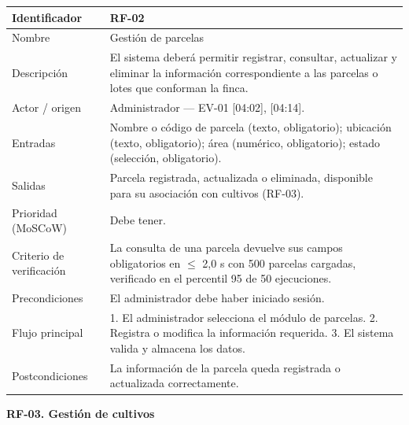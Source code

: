 \documentclass[12pt,a4paper]{article}
\begin{document}
\begin{center}
\begin{longtable}{|p{3.5cm}|p{10.7cm}|}
\hline
Identificador & RF-02 \\
\hline
Nombre & Gestión de parcelas \\
\hline
Descripción & El sistema deberá permitir registrar, consultar, actualizar y eliminar la información correspondiente a las parcelas o lotes que conforman la finca. \\
\hline
Actor / origen & Administrador --- EV-01 [04:02], [04:14]. \\
\hline
Entradas & Nombre o código de parcela (texto, obligatorio); ubicación (texto, obligatorio); área (numérico, obligatorio); estado (selección, obligatorio). \\
\hline
Salidas & Parcela registrada, actualizada o eliminada, disponible para su asociación con cultivos (RF-03). \\
\hline
Prioridad (MoSCoW) & Debe tener. \\
\hline
Criterio de verificación & La consulta de una parcela devuelve sus campos obligatorios en $\leq$ 2,0 s con 500 parcelas cargadas, verificado en el percentil 95 de 50 ejecuciones. \\
\hline
Precondiciones & El administrador debe haber iniciado sesión. \\
\hline
Flujo principal & 1. El administrador selecciona el módulo de parcelas. 2. Registra o modifica la información requerida. 3. El sistema valida y almacena los datos. \\
\hline
Postcondiciones & La información de la parcela queda registrada o actualizada correctamente. \\
\hline
\end{longtable}
\end{center}

\bigskip
\noindent\textbf{RF-03. Gestión de cultivos}
\label{tab:RF-03}
\end{document}
